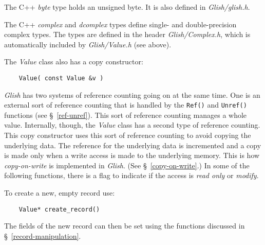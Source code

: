 The C++ {\em byte}
type holds an unsigned byte.  It is also defined in {\em Glish/glish.h}.

The C++ {\em complex} and {\em dcomplex}
types define single- and double-precision complex types.  The types
are defined in the header {\em Glish/Complex.h\/}, which is automatically
included by {\em Glish/Value.h} (see above).

The {\em Value} class also has a copy constructor:
\label{value-copy-ctor}
\begin{verbatim}
    Value( const Value &v )
\end{verbatim}
{\em Glish} has two systems of reference counting going on at the same time. One
is an external sort of reference counting that  is handled by the {\tt Ref()}
and {\tt Unref()} functions (see \S~\ref{ref-unref}). This sort of reference
counting manages a whole value. Internally, though, the {\em Value} class has
a second type of reference counting. This copy constructor uses this sort of
reference counting to avoid copying the underlying data. The reference for
the underlying data is incremented and a copy is made only  when a write
access is made to the underlying memory. This is how {\em copy-on-write}
is implemented in {\em Glish}.  (See \S~\ref{copy-on-write}.) In some of the
following functions, there is a flag to indicate if the access is
{\em read only} or {\em modify}. 

To create a new, empty record use:
\begin{verbatim}
    Value* create_record()
\end{verbatim}
The fields of the new record can then be set using the functions discussed
in \S~\ref{record-manipulation}.

